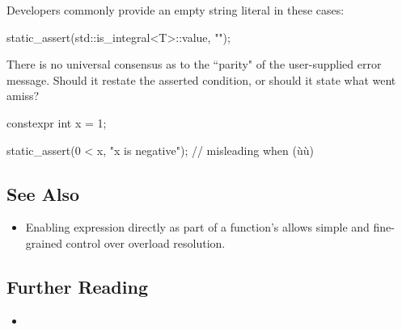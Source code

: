 \noindent Developers commonly provide an empty string literal in these
cases:

\begin{emcppslisting}[emcppsbatch=e7]
static_assert(std::is_integral<T>::value, "");
\end{emcppslisting}

There is no universal consensus as to the ``parity" of the user-supplied error message.  Should it restate the asserted condition, or should it state what went amiss?
\begin{emcppshiddenlisting}[emcppsbatch=e8]
constexpr int x = 1;
\end{emcppshiddenlisting}
\begin{emcppslisting}[emcppsbatch=e8]
static_assert(0 < x, "x is negative");
   // misleading when (ù{}ù)
\end{emcppslisting}

\subsection[See Also]{See Also}\label{see-also}

\begin{itemize}
\item{%
Enabling expression  directly as part of a function's   allows simple and fine-grained control over overload resolution.}
\end{itemize}

\subsection[Further Reading]{Further Reading}\label{further-reading}

\begin{itemize}
\item{\cite{klarer04}}
\end{itemize}


